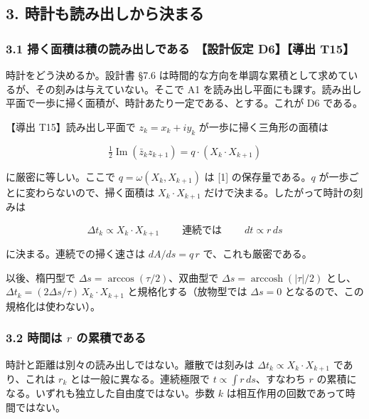\documentclass[
  a4paper,
]{ltjsarticle}
\begin{document}
\subsection{3.
時計も読み出しから決まる}\label{ux6642ux8a08ux3082ux8aadux307fux51faux3057ux304bux3089ux6c7aux307eux308b}

\subsubsection{3.1 掃く面積は積の読み出しである　【設計仮定 D6】【導出
T15】}\label{ux6383ux304fux9762ux7a4dux306fux7a4dux306eux8aadux307fux51faux3057ux3067ux3042ux308b-ux8a2dux8a08ux4eeeux5b9a-d6ux5c0eux51fa-t15}

時計をどう決めるか。設計書 §7.6
は時間的な方向を単調な累積として求めているが、その刻みは与えていない。そこで
A1
を読み出し平面にも課す。読み出し平面で一歩に掃く面積が、時計あたり一定である、とする。これが
D6 である。

【導出 T15】読み出し平面で \(z_k=x_k+iy_k\) が一歩に掃く三角形の面積は

\[
\tfrac12\operatorname{Im}(\bar z_kz_{k+1})=q\cdot(X_k\cdot X_{k+1})
\]

に厳密に等しい。ここで \(q=\omega(X_k,X_{k+1})\) は {[}1{]}
の保存量である。\(q\) が一歩ごとに変わらないので、掃く面積は
\(X_k\cdot X_{k+1}\) だけで決まる。したがって時計の刻みは

\[
\boxed{\;\Delta t_k\propto X_k\cdot X_{k+1}\;}\qquad\text{連続では}\qquad\boxed{\;dt\propto r\,ds\;}
\]

に決まる。連続での掃く速さは \(dA/ds=q\,r\) で、これも厳密である。

以後、楕円型で \(\Delta s=\arccos(\tau/2)\)、双曲型で
\(\Delta s=\operatorname{arccosh}(|\tau|/2)\)
とし、\(\Delta t_k=(2\Delta s/\tau)\,X_k\cdot X_{k+1}\)
と規格化する（放物型では \(\Delta s=0\)
となるので、この規格化は使わない）。

\subsubsection{\texorpdfstring{3.2 時間は \(r\)
の累積である}{3.2 時間は r の累積である}}\label{ux6642ux9593ux306f-r-ux306eux7d2fux7a4dux3067ux3042ux308b}

時計と距離は別々の読み出しではない。離散では刻みは
\(\Delta t_k\propto X_k\cdot X_{k+1}\) であり、これは \(r_k\)
とは一般に異なる。連続極限で \(t\propto\int r\,ds\)、すなわち \(r\)
の累積になる。いずれも独立した自由度ではない。歩数 \(k\)
は相互作用の回数であって時間ではない。
\end{document}
